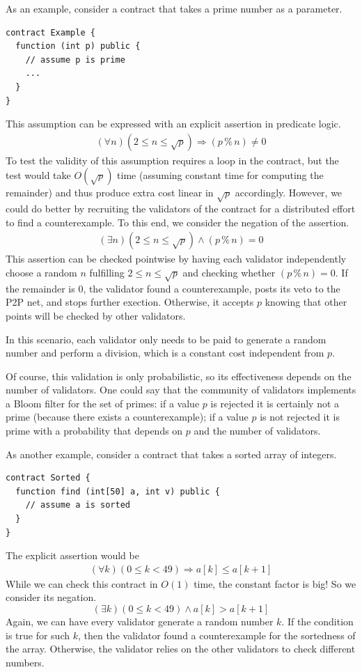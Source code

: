 \documentclass[runningheads]{llncs}
\begin{document}
As an example, consider a contract that takes a prime number as a parameter.
\begin{lstlisting}[numbers=none]
contract Example {
  function (int p) public {
    // assume p is prime
    ...
  }
}
\end{lstlisting}
This assumption can be expressed with an explicit assertion in predicate logic.
\begin{gather}\label{eq:5}
  (\forall n) (2 \le n \le \sqrt p) \Rightarrow (p \mathbin{\%} n) \ne 0
\end{gather}
To test the validity of this assumption requires a loop in the contract, but the test would take
$O(\sqrt p)$ time (assuming constant time for computing the remainder) and thus produce extra cost
linear in $\sqrt p$ accordingly. 
However, we could do better by recruiting the validators of the contract for a distributed
effort to find a counterexample. To this end, we consider the negation of the assertion.
\begin{gather}\label{eq:4}
  (\exists n) (2 \le n \le \sqrt p) \wedge (p \mathbin{\%} n) = 0
\end{gather}
This assertion can be checked pointwise by having each validator independently choose a
random $n$ fulfilling $2 \le n \le 
\sqrt p$ and checking whether $(p \mathbin{\%} n) = 0$. If the remainder is $0$, the
validator found a counterexample, posts its veto to the P2P net, and stops further
exection. Otherwise, it accepts $p$ knowing that other points will be checked by other
validators.

In this scenario, each validator only needs to be paid to generate a random number and
perform a division, which is a constant cost independent from $p$.

Of course, this validation is only probabilistic, so its effectiveness depends on the
number of validators. One could say that the community of validators implements a Bloom
filter for the set of primes: if a value $p$ is rejected it is certainly not a prime (because
there exists a counterexample); if a value $p$ is not rejected it is prime with a
probability that depends on $p$ and the number of validators. 

As another example, consider a contract that takes a sorted array of integers.
\begin{lstlisting}[numbers=none]
contract Sorted {
  function find (int[50] a, int v) public {
    // assume a is sorted
  }
}
\end{lstlisting}
The explicit assertion would be
\begin{gather}\label{eq:1}
  (\forall k) (0\le k <49) \Rightarrow a[k] \le a[k+1]
\end{gather}
While we can check this contract in $O(1)$ time, the constant factor is big! So we
consider its negation.
\begin{displaymath}
  (\exists k) (0\le k <49) \wedge a[k] > a[k+1]
\end{displaymath}
Again, we can have every validator generate a random number $k$. If the
condition is true for such $k$, then the validator found a counterexample for the sortedness
of the array. Otherwise, the validator relies on the other validators to check
different numbers.
\end{document}
